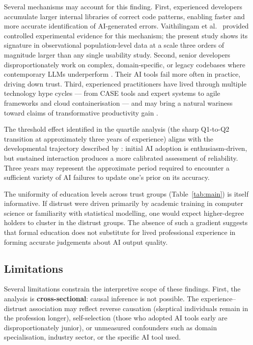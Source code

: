 \documentclass[11pt,a4paper]{article}
\begin{document}
Several mechanisms may account for this finding. First, experienced developers
accumulate larger internal libraries of correct code patterns, enabling faster and more
accurate identification of AI-generated errors. Vaithilingam et al.\
\cite{vaithilingam2022expectation} provided controlled experimental evidence for this
mechanism; the present study shows its signature in observational population-level data
at a scale three orders of magnitude larger than any single usability study. Second,
senior developers disproportionately work on complex, domain-specific, or legacy
codebases where contemporary LLMs underperform \cite{ziegler2022productivity}. Their
AI tools fail more often in practice, driving down trust. Third, experienced practitioners
have lived through multiple technology hype cycles --- from CASE tools and expert systems
to agile frameworks and cloud containerisation --- and may bring a natural wariness
toward claims of transformative productivity gain \cite{bird2022copilot}.

The threshold effect identified in the quartile analysis (the sharp Q1-to-Q2 transition
at approximately three years of experience) aligns with the developmental trajectory
described by \citet{liao2023transparency}: initial AI adoption is enthusiasm-driven, but
sustained interaction produces a more calibrated assessment of reliability. Three years
may represent the approximate period required to encounter a sufficient variety of AI
failures to update one's prior on its accuracy.

The uniformity of education levels across trust groups (Table~\ref{tab:main}) is itself
informative. If distrust were driven primarily by academic training in computer science
or familiarity with statistical modelling, one would expect higher-degree holders to
cluster in the distrust groups. The absence of such a gradient suggests that formal
education does not substitute for lived professional experience in forming accurate
judgements about AI output quality.

\subsection{Limitations}

Several limitations constrain the interpretive scope of these findings. First, the
analysis is \textbf{cross-sectional}: causal inference is not possible. The experience--distrust
association may reflect reverse causation (skeptical individuals remain in the profession
longer), self-selection (those who adopted AI tools early are disproportionately junior),
or unmeasured confounders such as domain specialisation, industry sector, or the specific
AI tool used.
\end{document}
